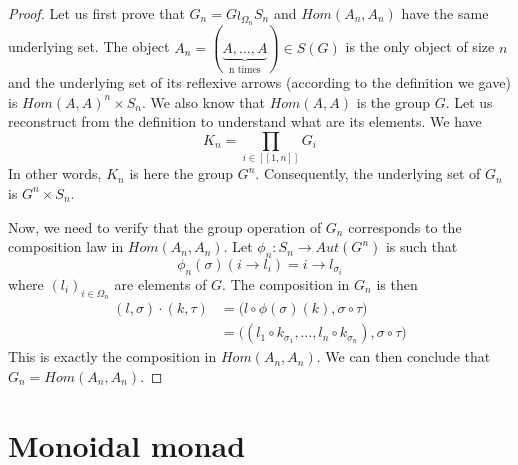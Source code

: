 \documentclass{report}
\begin{document}
\begin{proof}
    Let us first prove that $G_n = G\wr_{\Omega_n}S_n$ and $Hom(A_n,A_n)$ have the same underlying set.
    The object $A_n = (\underbrace{A,\dots,A}_\textrm{n times})\in S(G)$ is the only object of size $n$ and the underlying set of its reflexive arrows (according to the definition we gave) is $ Hom(A,A)^{n} \times S_n$. We also know that $Hom(A,A)$ is the group $G$.
    Let us reconstruct from the definition to understand what are its elements.
    We have $$K_n = \prod_{i\in [\![1,n]\!]}G_i$$
    In other words, $K_n$ is here the group $G^n$. Consequently, the underlying set of $G_n$ is $G^n\times S_n$.
    \vspace{0.5cm}

    Now, we need to verify that the group operation of $G_n$ corresponds to the composition law in $Hom(A_n,A_n)$.
    Let $\phi_n : S_n \rightarrow Aut(G^n)$ is such that $$\phi_n(\sigma)(i\rightarrow l_i) = i \rightarrow l_{\sigma_i}$$ where $(l_i)_{i\in \Omega_n}$ are elements of $G$. The composition in $G_n$ is then
    \begin{align*}
        (l,\sigma)\cdot (k,\tau) & = \big(l\circ \phi(\sigma)(k),\sigma\circ\tau\big)                                 \\
                                 & = \big((l_1 \circ k_{\sigma_1},\dots, l_n \circ k_{\sigma_n}),\sigma\circ\tau\big)
    \end{align*}
    This is exactly the composition in $Hom(A_n,A_n)$. We can then conclude that $G_n = Hom(A_n,A_n)$.

\end{proof}



\section{Monoidal monad}
\end{document}
